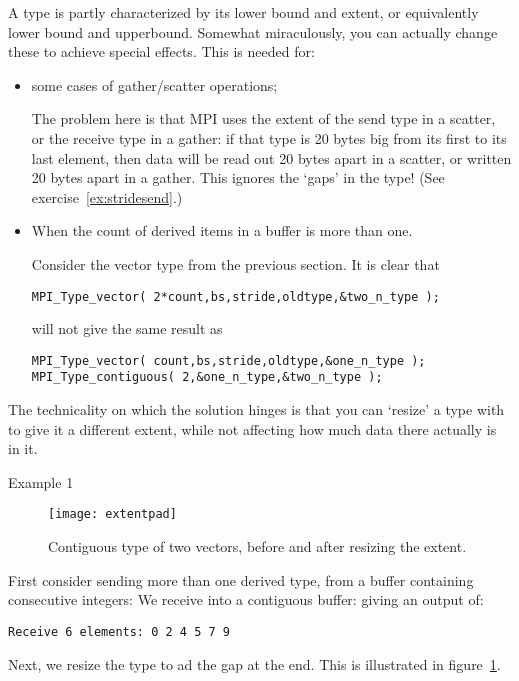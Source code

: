 A type is partly characterized by its lower bound and extent,
or equivalently lower bound and upperbound.
Somewhat miraculously, you can actually change these to achieve special effects.
This is needed for:
\begin{itemize}
\item
  some cases of gather/scatter operations;

The problem here is that MPI uses the extent of the send type in a scatter,
or the receive type in a gather: if that type is 20 bytes big from
its first to its last element, then
data will be read out 20 bytes apart in a scatter, or written 20 bytes apart
in a gather. This ignores the `gaps' in the type!
(See exercise~\ref{ex:stridesend}.)

\item When the count
  of derived items in a buffer is more than one.

Consider the vector type from the previous section.
It is clear that
\begin{lstlisting}
MPI_Type_vector( 2*count,bs,stride,oldtype,&two_n_type );
\end{lstlisting}
will not give the same result as
\begin{lstlisting}
MPI_Type_vector( count,bs,stride,oldtype,&one_n_type );
MPI_Type_contiguous( 2,&one_n_type,&two_n_type );
\end{lstlisting}
\end{itemize}

The technicality on which the solution hinges is that you can `resize' a type
with 
to give it a different extent, while not affecting how much data there
actually is in it.

 {Example 1}

\begin{figure}[ht]
  \texttt{[image: extentpad]}
  \caption{Contiguous type of two vectors,
    before and after resizing the extent.}
  \label{fig:extentpad}
\end{figure}

First consider sending more than one derived type,
from a buffer containing consecutive integers:
%
%
We receive into a contiguous buffer:
%
%
giving an output of:
\begin{verbatim}
Receive 6 elements: 0 2 4 5 7 9
\end{verbatim}
Next, we resize the type to ad the gap at the end.
This is illustrated in figure~\ref{fig:extentpad}.

